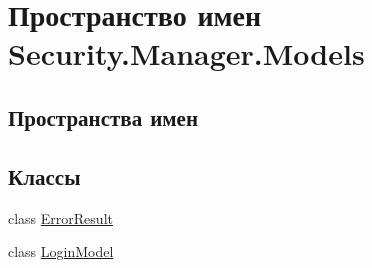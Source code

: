 \hypertarget{namespace_security_1_1_manager_1_1_models}{}\section{Пространство имен Security.\+Manager.\+Models}
\label{namespace_security_1_1_manager_1_1_models}
\subsection*{Пространства имен}
\begin{DoxyCompactItemize}
\end{DoxyCompactItemize}
\subsection*{Классы}
\begin{DoxyCompactItemize}
\item 
class \hyperlink{class_security_1_1_manager_1_1_models_1_1_error_result}{Error\+Result}
\item 
class \hyperlink{class_security_1_1_manager_1_1_models_1_1_login_model}{Login\+Model}
\end{DoxyCompactItemize}
